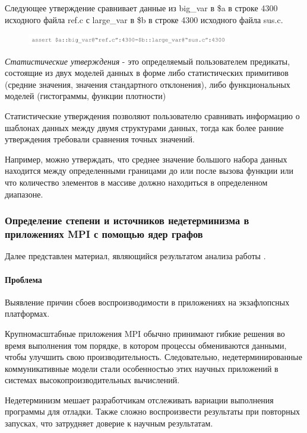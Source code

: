 Следующее утверждение сравнивает данные из big_var в \$a в строке 4300 исходного файла ref.c с large_var в \$b в строке 4300 исходного файла sus.c.

\begin{figure}[h]
	\includegraphics[width=0.8\textwidth]{ResearchNotes/rndhpc_not_edt_2021_11_10/krekhtunova/assert2.png}
\end{figure}

\textit{Статистические утверждения} - это определяемый пользователем предикаты, состоящие из двух моделей данных в форме либо статистических примитивов (средние значения, значения стандартного отклонения), либо функциональных моделей (гистограммы, функции плотности)

Статистические утверждения позволяют пользователю сравнивать информацию о шаблонах данных между двумя структурами данных, тогда как более ранние утверждения требовали сравнения точных значений.

Например, можно утверждать, что среднее значение большого набора данных находится между определенными границами до или после вызова функции или что количество элементов в массиве должно находиться в определенном диапазоне.

\subsubsection{Определение степени и источников недетерминизма в приложениях MPI с помощью ядер графов}

Далее представлен материал, являющийся результатом анализа работы \cite{Chapp2021}.

\paragraph{Проблема}

Выявление причин сбоев воспроизводимости в приложениях на экзафлопсных платформах.

Крупномасштабные приложения MPI обычно принимают гибкие решения во время выполнения том порядке, в котором процессы обмениваются данными, чтобы улучшить свою производительность. Следовательно, недетерминированные коммуникативные модели стали особенностью этих научных приложений в системах высокопроизводительных вычислений.

Недетерминизм мешает разработчикам отслеживать вариации выполнения программы для отладки. Также сложно воспроизвести результаты при повторных запусках, что затрудняет доверие к научным результатам.


